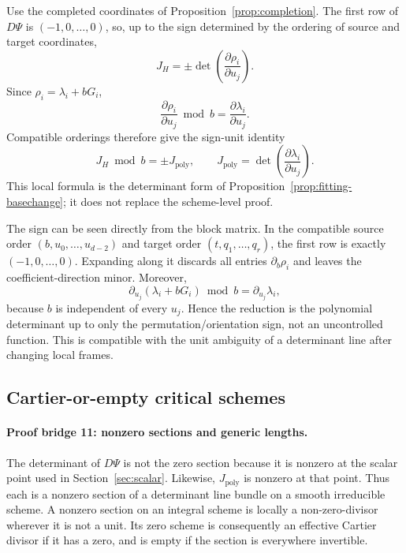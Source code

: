 \documentclass[11pt]{article}
\theoremstyle{definition}
\theoremstyle{remark}
\begin{document}
Use the completed coordinates of Proposition~\ref{prop:completion}.  The
first row of $D\Psi$ is $(-1,0,\ldots,0)$, so, up to the sign determined by
the ordering of source and target coordinates,
\[
  J_H
  =
  \pm\det\left(
    \frac{\partial\rho_i}{\partial u_j}
  \right).
\]
Since $\rho_i=\lambda_i+bG_i$,
\[
  \frac{\partial\rho_i}{\partial u_j}\bmod b
  =
  \frac{\partial\lambda_i}{\partial u_j}.
\]
Compatible orderings therefore give the sign-unit identity
\begin{equation}
\label{eq:jacobian-congruence}
  J_H\bmod b=\pm J_{\mathrm{poly}},
  \qquad
  J_{\mathrm{poly}}
  =
  \det\left(
    \frac{\partial\lambda_i}{\partial u_j}
  \right).
\end{equation}
This local formula is the determinant form of
Proposition~\ref{prop:fitting-basechange}; it does not replace the
scheme-level proof.

The sign can be seen directly from the block matrix.  In the compatible
source order $(b,u_0,\ldots,u_{d-2})$ and target order
$(t,q_1,\ldots,q_r)$, the first row is exactly
$(-1,0,\ldots,0)$.  Expanding along it discards all entries
$\partial_b\rho_i$ and leaves the coefficient-direction minor.  Moreover,
\[
  \partial_{u_j}(\lambda_i+bG_i)\bmod b
  =\partial_{u_j}\lambda_i,
\]
because $b$ is independent of every $u_j$.  Hence the reduction is the
polynomial determinant up to only the permutation/orientation sign, not an
uncontrolled function.  This is compatible with the unit ambiguity of a
determinant line after changing local frames.

\subsection{Cartier-or-empty critical schemes}

\paragraph{Proof bridge 11: nonzero sections and generic lengths.}
The determinant of $D\Psi$ is not the zero section because it is nonzero at
the scalar point used in Section~\ref{sec:scalar}.  Likewise,
$J_{\mathrm{poly}}$ is nonzero at that point.  Thus each is a nonzero
section of a determinant line bundle on a smooth irreducible scheme.  A
nonzero section on an integral scheme is locally a non-zero-divisor wherever
it is not a unit.  Its zero scheme is consequently an effective Cartier
divisor if it has a zero, and is empty if the section is everywhere
invertible.
\end{document}
